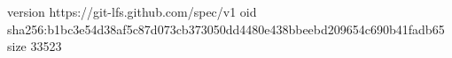version https://git-lfs.github.com/spec/v1
oid sha256:b1bc3e54d38af5c87d073cb373050dd4480e438bbeebd209654c690b41fadb65
size 33523
